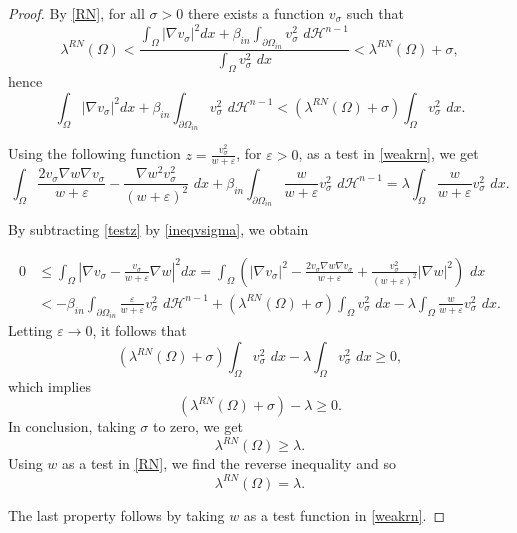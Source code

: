 \documentclass[oneside,a4paper,11pt,notitlepage]{article}
\newcommand{\abs}[1]{{\left|#1\right|}}
\theoremstyle{plain}
\numberwithin{teor}{section}
\numberwithin{equation}{section}
\theoremstyle{definition}
\theoremstyle{plain}
\theoremstyle{plain}
\theoremstyle{plain}
\theoremstyle{plain}
\theoremstyle{definition}
\theoremstyle{definition}
\theoremstyle{plain}
\begin{document}
\begin{proof}

 By \eqref{RN}, for all $\sigma>0$ there exists a function $v_\sigma$ such that $$\lambda^{RN}(\Omega)<\frac{\displaystyle \int_\Omega \abs{\nabla v_\sigma}^2 dx +\beta_{in}\int_{\partial \Omega_{in}}v_\sigma^2 \,\,d\mathcal{H}^{n-1}}{\displaystyle \int_{\Omega}v_\sigma^2 \,\,dx}<\lambda^{RN}(\Omega)+\sigma,$$
hence
\begin{equation}
\label{ineqvsigma}
  \displaystyle \int_\Omega \abs{\nabla v_\sigma}^2 dx +\beta_{in}\int_{\partial \Omega_{in}}v_\sigma^2 \,\,d\mathcal{H}^{n-1}<\left(\lambda^{RN}(\Omega)+\sigma\right)\int_{\Omega}v_\sigma^2 \,\,dx.
\end{equation}



Using the following function $\displaystyle z=\frac{v_\sigma^2}{w+\varepsilon}$, for $\varepsilon>0$, as a test in \eqref{weakrn}, we get 
\begin{equation}
\label{testz}
    \int_{\Omega} \frac{2 v_\sigma \nabla w \nabla v_\sigma}{w+\varepsilon} - \frac{\nabla w^2 v_\sigma^2}{(w+\varepsilon)^2}\,\,dx +\beta_{in} \int_{\partial \Omega_{in}}\frac{w}{w+\varepsilon}v_\sigma^2 \,\,d \mathcal{H}^{n-1}=\lambda\int_{\Omega}\frac{w}{w+\varepsilon}v_\sigma^2 \,\,dx.
\end{equation}

By subtracting \eqref{testz} by \eqref{ineqvsigma}, we obtain

\begin{equation}
\begin{aligned}
     0  &\leq \int_\Omega \abs{\nabla v_\sigma -\frac{ v_\sigma}{w+\varepsilon}\nabla w}^2dx= \int_\Omega \left(\abs{\nabla v_\sigma}^2 - \frac{2 v_\sigma \nabla w \nabla v_\sigma}{w+\varepsilon} + \frac{ v_\sigma^2}{(w+\varepsilon)^2}\abs{\nabla w}^2\right)\,\,dx   \\&<-\beta_{in} \int_{\partial \Omega_{in}}\frac{\varepsilon}{w+\varepsilon}v_\sigma^2 \,\,d \mathcal{H}^{n-1}+\left(\lambda^{RN}(\Omega)+\sigma\right)\int_{\Omega}v_\sigma^2 \,\,dx-\lambda\int_{\Omega}\frac{w}{w+\varepsilon}v_\sigma^2 \,\,dx.
    \end{aligned}
\end{equation}
Letting $\varepsilon \rightarrow 0$, it follows that
\begin{equation}
     \left(\lambda^{RN}(\Omega)+\sigma\right)\int_{\Omega}v_\sigma^2 \,\,dx-\lambda\int_{\Omega}v_\sigma^2 \,\,dx\geq 0,
\end{equation}
which implies $$\left(\lambda^{RN}(\Omega)+\sigma\right)-\lambda\geq 0.$$
In conclusion, taking $\sigma$ to zero, we get $$\lambda^{RN}(\Omega)\geq\lambda.$$
Using $w$ as a test in \eqref{RN}, we find the reverse inequality and so $$\lambda^{RN}(\Omega)=\lambda.$$

The last property follows by taking 
$w$ as a test function in \eqref{weakrn}.
\end{proof}
\end{document}
